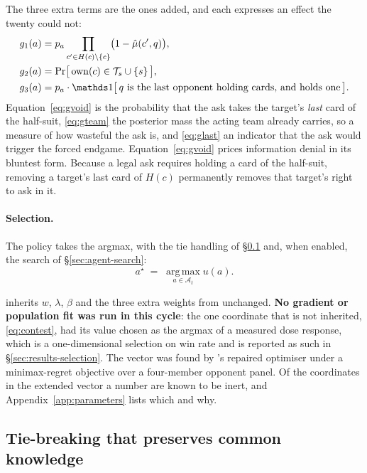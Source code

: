 The three extra terms are the ones \vsix{} added, and each expresses an effect the twenty could not:
\begin{align}
  g_1(a) &= p_a \prod_{c' \in H(c) \setminus \{c\}} \bigl(1 - \hat\mu(c',q)\bigr),
    \label{eq:gvoid}\\
  g_2(a) &= \Pr\bigl[\,\mathrm{own}(c) \in \mathcal{T}_s \cup \{s\}\,\bigr],
    \label{eq:gteam}\\
  g_3(a) &= p_a \cdot \ind\bigl[\,q \text{ is the last opponent holding cards, and holds one}\,\bigr].
    \label{eq:glast}
\end{align}
Equation~\eqref{eq:gvoid} is the probability that the ask takes the target's \emph{last} card of the
half-suit, \eqref{eq:gteam} the posterior mass the acting team already carries, so a measure of how
wasteful the ask is, and \eqref{eq:glast} an indicator that the ask would trigger the forced
endgame.
Equation~\eqref{eq:gvoid} prices information denial in its bluntest form. Because a legal ask requires
holding a card of the half-suit, removing a target's last card of $H(c)$ permanently removes that
target's right to ask in it.

\paragraph{Selection.} The policy takes the argmax, with the tie handling of
\S\ref{sec:agent-tiebreak} and, when enabled, the search of \S\ref{sec:agent-search}:
\begin{equation}
  a^\star \;=\; \operatorname*{arg\,max}_{a \in \mathcal{A}_t} u(a).
  \label{eq:argmax}
\end{equation}

\sestina{} inherits $w$, $\lambda$, $\beta$ and the three extra weights from \vsix{} unchanged.
\textbf{No gradient or population fit was run in this cycle}: the one coordinate that is not
inherited, \eqref{eq:contest}, had its value chosen as the argmax of a measured dose response, which
is a one-dimensional selection on win rate and is reported as such in
\S\ref{sec:results-selection}. The vector was found by \vsix{}'s repaired
optimiser under a minimax-regret objective over a four-member opponent panel. Of the
\vsevenCoordinates{} coordinates in the extended vector a number are known to be inert, and
Appendix~\ref{app:parameters} lists which and why.

\subsection{Tie-breaking that preserves common knowledge}
\label{sec:agent-tiebreak}


